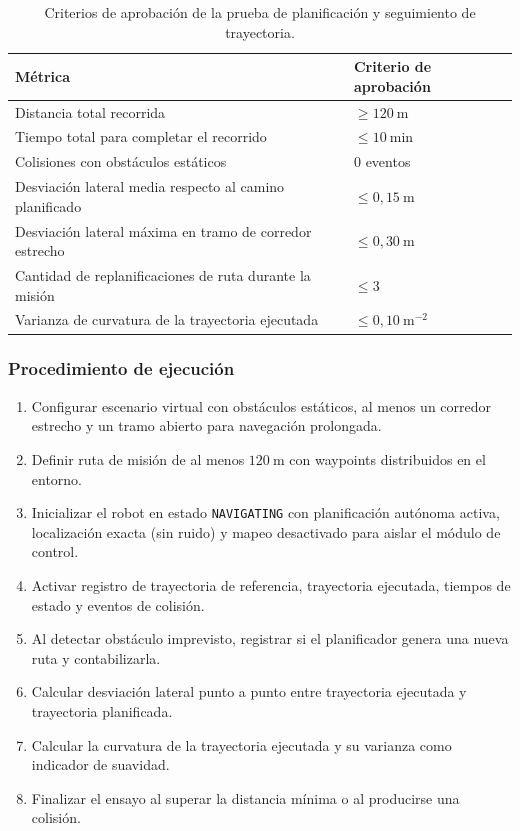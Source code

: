 \begin{table}[H]
\centering
\small
\begin{tabular}{p{8.8cm} p{4.1cm}}
\toprule
\textbf{Métrica} & \textbf{Criterio de aprobación} \\
\midrule
Distancia total recorrida & $\geq 120\ \text{m}$ \\
Tiempo total para completar el recorrido & $\leq 10\ \text{min}$ \\
Colisiones con obstáculos estáticos & 0 eventos \\
Desviación lateral media respecto al camino planificado & $\leq 0{,}15\ \text{m}$ \\
Desviación lateral máxima en tramo de corredor estrecho & $\leq 0{,}30\ \text{m}$ \\
Cantidad de replanificaciones de ruta durante la misión & $\leq 3$ \\
Varianza de curvatura de la trayectoria ejecutada & $\leq 0{,}10\ \text{m}^{-2}$ \\
\bottomrule
\end{tabular}
\caption{Criterios de aprobación de la prueba de planificación y seguimiento de trayectoria.}
\label{tab:criterios_prueba_path_planning}
\end{table}

\subsubsection{Procedimiento de ejecución}

\begin{enumerate}
    \item Configurar escenario virtual con obstáculos estáticos, al menos un corredor estrecho y un tramo abierto para navegación prolongada.
    \item Definir ruta de misión de al menos $120\ \text{m}$ con waypoints distribuidos en el entorno.
    \item Inicializar el robot en estado \texttt{NAVIGATING} con planificación autónoma activa, localización exacta (sin ruido) y mapeo desactivado para aislar el módulo de control.
    \item Activar registro de trayectoria de referencia, trayectoria ejecutada, tiempos de estado y eventos de colisión.
    \item Al detectar obstáculo imprevisto, registrar si el planificador genera una nueva ruta y contabilizarla.
    \item Calcular desviación lateral punto a punto entre trayectoria ejecutada y trayectoria planificada.
    \item Calcular la curvatura de la trayectoria ejecutada y su varianza como indicador de suavidad.
    \item Finalizar el ensayo al superar la distancia mínima o al producirse una colisión.
\end{enumerate}

